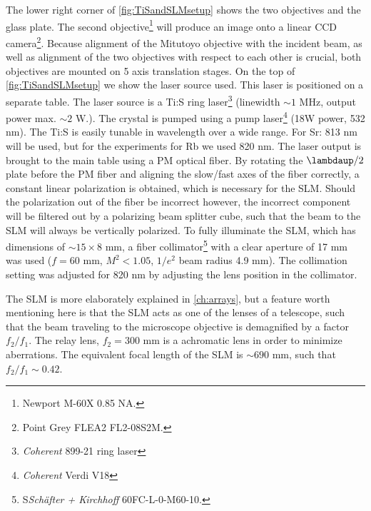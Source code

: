 The lower right corner of \cref{fig:TiSandSLMsetup} shows the two objectives and the glass plate. 
The second objective\footnote{Newport M-60X 0.85 NA.} will produce an image onto a linear \ac{CCD} camera\footnote{Point Grey FLEA2 FL2-08S2M.}. 
Because alignment of the Mitutoyo objective with the incident beam, as well as alignment of the two objectives with respect to each other is crucial, both objectives are mounted on 5 axis translation stages. 
On the top of \cref{fig:TiSandSLMsetup} we show the laser source used.
This laser is positioned on a separate table. 
The laser source is a \ac{Ti:S} ring laser\footnote{\textit{Coherent} 899-21 ring laser} (linewidth $\sim 1$ MHz, output power max. $\sim 2$ W.). 
The crystal is pumped using a pump laser\footnote{\textit{Coherent} Verdi V18} (18W power, 532 nm).
The \ac{Ti:S} is easily tunable in wavelength over a wide range. For Sr: 813 nm will be used, but for the experiments for Rb we used 820 nm. 
The laser output is brought to the main table using a \ac{PM} optical fiber.
By rotating the $\lambdaup/2$ plate before the PM fiber and aligning the slow/fast axes of the fiber correctly, a constant linear polarization is obtained, which is necessary for the \ac{SLM}.
Should the polarization out of the fiber be incorrect however, the incorrect component will be filtered out by a polarizing beam splitter cube, such that the beam to the SLM will always be vertically polarized.
To fully illuminate the SLM, which has dimensions of $\sim 15 \times 8$ mm, a fiber collimator\footnote{S\textit{Schäfter + Kirchhoff} 60FC-L-0-M60-10.} with a clear aperture of 17 mm was used ($f=60$ mm, $M^2 < 1.05$, $1/e^2$ beam radius 4.9 mm).
The collimation setting was adjusted for 820 nm by adjusting the lens position in the collimator.

The SLM is more elaborately explained in \cref{ch:arrays}, but a feature worth mentioning here is that the SLM acts as one of the lenses of a telescope, such that the beam traveling to the microscope objective is demagnified by a factor $f_2/f_1$.
The relay lens, $f_2=300$ mm is a achromatic lens in order to minimize aberrations.
The equivalent focal length of the SLM is $\sim 690$ mm, such that $f_2/f_1 \sim 0.42$.

